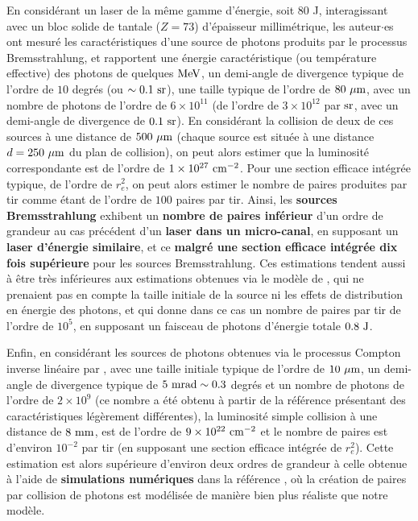 \begin{refsection}
En considérant un laser de la même gamme d'énergie, soit 80 J, interagissant avec un bloc solide de tantale ($Z=73$) d'épaisseur millimétrique, les auteur$\cdot$es \cite{palaniyappan_2019} ont mesuré les caractéristiques d'une source de photons produits par le processus Bremsstrahlung, et rapportent une énergie caractéristique (ou température effective) des photons de quelques $\rm MeV$, un demi-angle de divergence typique de l'ordre de $10$ degrés (ou $\sim 0.1 ~ \rm sr$), une taille typique de l'ordre de $80 ~ \rm \mu m$, avec un nombre de photons de l'ordre de $6 \times 10^{11}$ (de l'ordre de $3 \times 10^{12}$ par $\rm sr$, avec un demi-angle de divergence de $0.1 ~ \rm sr$). En considérant la collision de deux de ces sources à une distance de $500 ~ \rm \mu m$ (chaque source est située à une distance $d=250 ~ \rm \mu m$ du plan de collision), on peut alors estimer que la luminosité correspondante est de l'ordre de $1 \times 10^{27} ~ \rm cm^{-2}$. Pour une section efficace intégrée typique, de l'ordre de $r_e^2$, on peut alors estimer le nombre de paires produites par tir comme étant de l'ordre de $100$ paires par tir. Ainsi, les \textbf{sources Bremsstrahlung} exhibent un \textbf{nombre de paires inférieur} d'un ordre de grandeur au cas précédent d'un \textbf{laser dans un micro-canal}, en supposant un \textbf{laser d'énergie similaire}, et ce \textbf{malgré une section efficace intégrée dix fois supérieure} pour les sources Bremsstrahlung. Ces estimations tendent aussi à être très inférieures aux estimations obtenues via le modèle de \cite{ribeyre_2016}, qui ne prenaient pas en compte la taille initiale de la source ni les effets de distribution en énergie des photons, et qui donne dans ce cas un nombre de paires par tir de l'ordre de $10^5$, en supposant un faisceau de photons d'énergie totale $0.8 ~ \rm J$.

Enfin, en considérant les sources de photons obtenues via le processus Compton inverse linéaire par \cite{drebot_2017a}, avec une taille initiale typique de l'ordre de $10 ~ \rm \mu m$, un demi-angle de divergence typique de $5 ~ \rm mrad \sim 0.3$ degrés et un nombre de photons de l'ordre de $2 \times 10^9$ (ce nombre a été obtenu à partir de la référence \parencite{micieli_2016a} présentant des caractéristiques légèrement différentes), la luminosité simple collision à une distance de $8 ~ \rm mm$, est de l'ordre de $9 \times 10^{22} ~ \rm cm^{-2}$ et le nombre de paires est d'environ $10^{-2}$ par tir (en supposant une section efficace intégrée de $r_e^2$). Cette estimation est alors supérieure d'environ deux ordres de grandeur à celle obtenue à l'aide de \textbf{simulations numériques} dans la référence \parencite{drebot_2017a}, où la création de paires par collision de photons est modélisée de manière bien plus réaliste que notre modèle.


\end{refsection}

